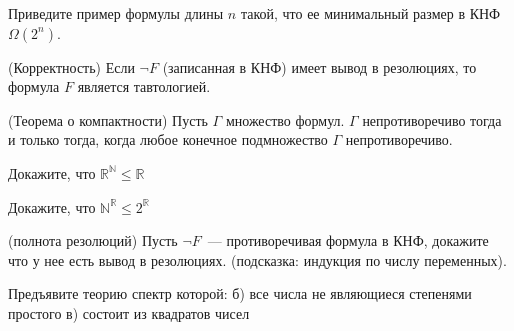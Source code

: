 \begin{ptask}{3}
    Приведите пример формулы длины $n$ такой, что ее минимальный
    размер в КНФ $\Omega(2^n)$.
\end{ptask}

\begin{ptask}{4} (Корректность)
    Если $\neg F$ (записанная в КНФ) имеет вывод в резолюциях, то
    формула $F$ является тавтологией.
\end{ptask}

\begin{ptask}{5} (Теорема о компактности)
    Пусть $\Gamma$ множество формул. $\Gamma$ непротиворечиво тогда и
    только тогда, когда любое конечное подмножество $\Gamma$ непротиворечиво.
\end{ptask}


\begin{ptask}{8}
    Докажите, что $\mathbb{R}^{\mathbb{N}} \le \mathbb{R}$
\end{ptask}

\begin{ptask}{9}
    Докажите, что $\mathbb{N}^{\mathbb{R}} \le 2^{\mathbb{R}}$
\end{ptask}


\begin{ptask}{10} (полнота резолюций)
    Пусть $\neg F$~--- противоречивая формула в КНФ, докажите что у нее есть вывод в 
    резолюциях. (подсказка: индукция по числу переменных).
\end{ptask}

\begin{ptask}{13}
    Предъявите теорию спектр которой:
    б) все числа не являющиеся степенями простого
    в) состоит из квадратов чисел
\end{ptask}